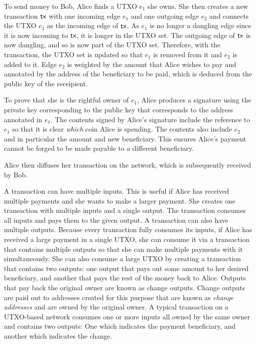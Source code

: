 To send money to Bob, Alice finds a UTXO $e_1$ she owns. She then creates a new
transaction $\mathsf{tx}$ with one incoming edge $e_1$ and one outgoing edge $e_2$ and
connects the UTXO $e_1$ as the incoming edge of $\mathsf{tx}$. As $e_1$ is no longer
a dangling edge since it is now incoming to $\mathsf{tx}$, it is longer in the UTXO set.
The outgoing edge of $\mathsf{tx}$ is now dangling, and so is now part of the UTXO set.
Therefore, with the transaction, the UTXO set is updated so that $e_1$ is
removed from it and $e_2$ is added to it. Edge $e_2$ is weighted by the amount
that Alice wishes to pay and annotated by the address of the beneficiary to be
paid, which is deduced from the public key of the receipient.

To prove that she is the rightful owner of $e_1$, Alice produces a signature
using the private key corresponding to the public key that corresponds to the
address annotated in $e_1$. The contents signed by Alice's signature include the
reference to $e_1$ so that it is clear \emph{which} coin Alice is spending. The
contents also include $e_2$ and in particular the amount and new beneficiary.
This ensures Alice's payment cannot be forged to be made payable to a different
beneficiary.

Alice then diffuses her transaction on the network, which is subsequently
received by Bob.

A transaction can have multiple inputs. This is useful if Alice has received
multiple payments and she wants to make a larger payment. She creates one
transaction with multiple inputs and a single output. The transaction consumes
all inputs and pays them to the given output. A transaction can also have
multiple outputs. Because every transaction fully consumes its inputs, if Alice
has received a large payment in a single UTXO, she can consume it via a
transaction that contains multiple outputs so that she can make multiple
payments with it simultaneously. She can also consume a large UTXO by creating
a transaction that contains two outputs: one output that pays out some amount to
her desired beneficiary, and another that pays the rest of the money back to
Alice. Outputs that pay back the original owner are known as change outputs.
Change outputs are paid out to addresses created for this purpose that are known
as \emph{change addresses} and are owned by the original
owner. A typical transaction on a UTXO-based network consumes one or more inputs
all owned by the same owner and contains two outputs: One which indicates the
payment beneficiary, and another which indicates the change.

